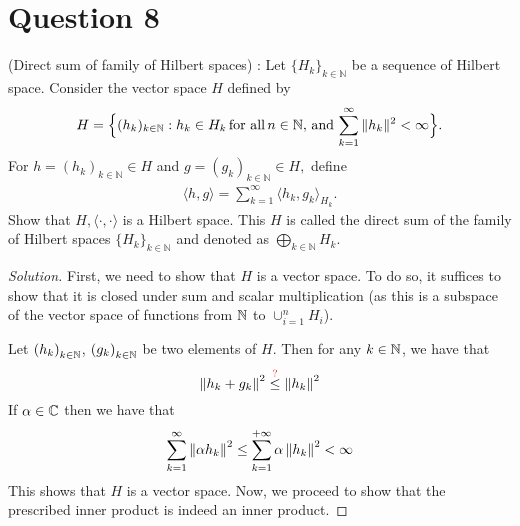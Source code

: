 \section{Question 8}

\horz
(Direct sum of family of Hilbert spaces) : Let $\{H_k\}_{k\in \mathbb N}$ be a sequence of Hilbert space. Consider the vector space $H$ defined by 
\begin{align*}
H = \Big\{ (h_k)_{k\in\mathbb N} : h_k\in H_k \mbox{\,for all\,} n\in\mathbb N, \,\mbox{and}\, \sum\limits_{k=1}^{\infty}\|h_k\|^2 < \infty\Big\}.
\end{align*}
For $h= (h_k)_{k\in\mathbb N} \in H$ and $g = (g_k)_{k\in\mathbb N}\in H,$ define
\begin{align*}
\langle h,g\rangle = \sum\limits_{k=1}^{\infty} \langle h_k,g_k\rangle_{H_k}.
\end{align*} 
Show that $H,\langle \cdot, \cdot \rangle$ is a Hilbert space. This $H$ is called the direct sum of the family of Hilbert spaces  $\{H_k\}_{k\in \mathbb N}$ and denoted as $\bigoplus\limits _{k\in\mathbb N} H_k.$
\horz

\begin{proof}[Solution]
    First, we need to show that $H$ is a vector space. To do so, it suffices to show that it is closed under sum and scalar multiplication (as this is a subspace of the vector space of functions from $\mathbb N$ to $\cup_{i=1}^{n} H_{i}$). 

Let $\left( h_{k} \right)_{k \in \mathbb N}$, $\left( g_{k} \right)_{k\in \mathbb N}$ be two elements of $H$. Then for any $k\in \mathbb N$, we have that
\begin{equation*}
\left\lVert h_{k} + g_{k} \right\rVert ^{2} \stackrel{\textcolor{red}{?}}\le \left\lVert h_{k} \right\rVert^{2} \end{equation*}
If $\alpha \in \mathbb C$ then we have that 
\begin{align*}
    \sum_{k=1}^{\infty} \left\lVert \alpha h_{k} \right\rVert^{2} \le \sum_{k=1}^{+\infty} \alpha \left\lVert h_{k} \right\rVert^{2} < \infty
\end{align*}
This shows that $H$ is a vector space. Now, we proceed to show that the prescribed inner product is indeed an inner product.

\end{proof}
